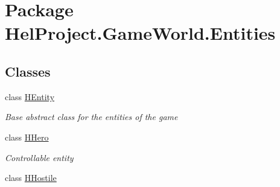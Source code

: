 \hypertarget{namespace_hel_project_1_1_game_world_1_1_entities}{}\section{Package Hel\+Project.\+Game\+World.\+Entities}
\label{namespace_hel_project_1_1_game_world_1_1_entities}
\subsection*{Classes}
\begin{DoxyCompactItemize}
\item 
class \hyperlink{class_hel_project_1_1_game_world_1_1_entities_1_1_h_entity}{H\+Entity}
\begin{DoxyCompactList}\small\item\em Base abstract class for the entities of the game \end{DoxyCompactList}\item 
class \hyperlink{class_hel_project_1_1_game_world_1_1_entities_1_1_h_hero}{H\+Hero}
\begin{DoxyCompactList}\small\item\em Controllable entity \end{DoxyCompactList}\item 
class \hyperlink{class_hel_project_1_1_game_world_1_1_entities_1_1_h_hostile}{H\+Hostile}
\end{DoxyCompactItemize}
